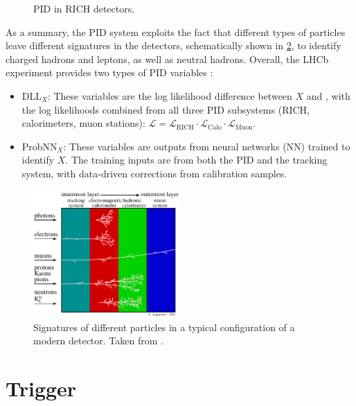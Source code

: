 \begin{figure}[!htb]
    \caption{
        PID in RICH detectors.
    }
    \label{fig:rich-plots}
\end{figure}

As a summary, the PID system exploits the fact that different types of
particles leave different signatures in the detectors,
schematically shown in \cref{fig:pid-signature},
to identify charged hadrons and leptons, as well as neutral hadrons.
Overall, the LHCb experiment provides two types of PID variables
\cite{Seuthe:2021fcn}:

\begin{itemize}
    \item DLL$_X$:
        These variables are the log likelihood difference between $X$ and \pion,
        with the log likelihoods combined from all three PID subsystems
        (RICH, calorimeters, muon stations):
        $\mathcal{L} = \mathcal{L}_\text{RICH} \cdot \mathcal{L}_\text{Calo}
        \cdot \mathcal{L}_\text{Muon}$.

    \item ProbNN$_X$:
        These variables are outputs from neural networks (NN) trained to
        identify $X$.
        The training inputs are from both the PID and the tracking system,
        with data-driven corrections from calibration samples.
\end{itemize}

\begin{figure}[!htb]
    \centering
    \includegraphics[width=0.5\textwidth]{./figs-detector/pid/pid_signatures.pdf}
    \caption{
        Signatures of different particles in a typical configuration
        of a modern detector.
        Taken from \cite{Lippmann_2012}.
    }
    \label{fig:pid-signature}
\end{figure}


\section{Trigger}
\label{ref:detector:trigger}

